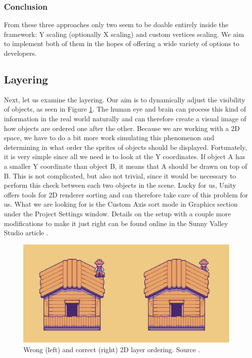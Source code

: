 \subsubsection{Conclusion}
From these three approaches only two seem to be doable entirely inside the framework: Y scaling (optionally X scaling) and custom vertices scaling. We aim to implement both of them in the hopes of offering a wide variety of options to developers.

\subsection{Layering}
Next, let us examine the layering. Our aim is to dynamically adjust the visibility of objects, as seen in Figure \ref{fig:Layers}. The human eye and brain can process this kind of information in the real world naturally and can therefore create a visual image of how objects are ordered one after the other. Because we are working with a 2D space, we have to do a bit more work simulating this phenomenon and determining in what order the sprites of objects should be displayed. Fortunately, it is very simple since all we need is to look at the Y coordinates. If object A has a smaller Y coordinate than object B, it means that A should be drawn on top of B. This is not complicated, but also not trivial, since it would be necessary to perform this check between each two objects in the scene. Lucky for us, Unity offers tools for 2D renderer sorting \cite{Unity-sorting} and can therefore take care of this problem for us. What we are looking for is the Custom Axis sort mode \cite{Unity-customAxis} in Graphics section under the Project Settings window. Details on the setup with a couple more modifications to make it just right can be found online in the Sunny Valley Studio article \cite{Piotr} . 

\begin{figure}[H]
\centering
\includegraphics[width=.8\linewidth]{img/layers.png}
\caption{Wrong (left) and correct (right) 2D layer ordering. Source \cite{Piotr}.}
\label{fig:Layers}
\end{figure}

